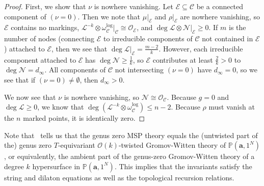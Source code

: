\documentclass[10pt]{amsart}
\theoremstyle{definition}
\theoremstyle{remark}
\theoremstyle{plain}
\theoremstyle{definition}
\theoremstyle{remark}
\newcommand{\ba}{\mathbf{a}}
\renewcommand{\P}{\mathbb{P}}
\newcommand{\msc}[1]{\mathscr{#1}}
\newcommand{\1}{\mathbf{1}}
\newcommand{\2}{\mathbf{2}}
\newcommand{\3}{\mathbf{3}}
\numberwithin{equation}{section}
\begin{document}
\begin{proof}
    First, we show that $\nu$ is nowhere vanishing. Let $\msc{E} \subseteq \msc{C}$ be a connected component of $(\nu = 0)$. Then we note that $\mu|_{\msc{E}}$ and $\rho|_{\msc{E}}$ are nowhere vanishing, so $\msc{E}$ contains no markings, $\msc{L}^{-k} \otimes \omega_{\msc{C}}^{\log}|_{\msc{C}} \cong \msc{O}_{\msc{E}}$, and $\deg \msc{L} \otimes \msc{N}|_{\msc{E}} \geq 0$. If $m$ is the number of nodes (connecting $\msc{E}$ to irreducible components of $\msc{C}$ not contained in $\msc{E}$) attached to $\msc{E}$, then we see that $\deg \msc{L}|_{\msc{E}} = \frac{m-2}{k}$. However, each irreducible component attached to $\msc{E}$ has $\deg \msc{N} \geq \frac{1}{k}$, so $\msc{E}$ contributes at least $\frac{2}{k} > 0$ to $\deg \msc{N} = d_{\infty}$. All components of $\msc{C}$ not intersecting $(\nu = 0)$ have $d_{\infty} = 0$, so we see that if $(\nu = 0) \neq \emptyset$, then $d_{\infty} > 0$.

    We now see that $\nu$ is nowhere vanishing, so $\msc{N} \cong \msc{O}_{\msc{C}}$. Because $g = 0$ and $\deg \msc{L} \geq 0$, we know that $\deg(\msc{L}^{-k} \otimes \omega_{\msc{C}}^{\log}) \leq n-2$. Because $\rho$ must vanish at the $n$ marked points, it is identically zero.
\end{proof}

Note that~ tells us that the genus zero MSP theory equals the (untwisted part of the) genus zero $T$-equivariant $\msc{O}(k)$-twisted Gromov-Witten theory of $\P(\ba, 1^N)$, or equivalently, the ambient part of the genus-zero Gromov-Witten theory of a degree $k$ hypersurface in $\P(\ba, 1^N)$. This implies that the invariants satisfy the string and dilaton equations as well as the topological recursion relations.
\end{document}

